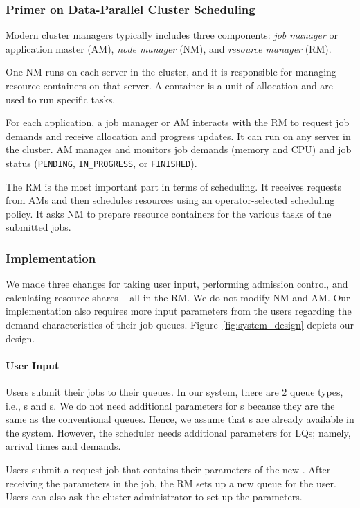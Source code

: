 \subsubsection*{Primer on Data-Parallel Cluster Scheduling}
Modern cluster managers typically includes three components: \emph{job manager} or application master (AM), \emph{node manager} (NM), and \emph{resource manager} (RM).

One NM runs on each server in the cluster, and it is responsible for managing resource containers on that server. 
A container is a unit of allocation and are used to run specific tasks. 

For each application, a job manager or AM interacts with the RM to request job demands and receive allocation and progress updates. 
It can run on any server in the cluster. 
AM manages and monitors job demands (memory and CPU) and job status (\texttt{PENDING}, \texttt{IN\_PROGRESS}, or \texttt{FINISHED}). 

The RM is the most important part in terms of scheduling. 
It receives requests from AMs and then schedules resources using an operator-selected scheduling policy. 
It asks NM to prepare resource containers for the various tasks of the submitted jobs.

\subsubsection*{\name Implementation}
We made three changes for taking user input, performing admission control, and calculating resource shares -- all in the RM.
We do not modify NM and AM.
Our implementation also requires more input parameters from the users regarding the demand characteristics of their job queues. 
Figure~\ref{fig:system_design} depicts our design.

\paragraph{User Input} Users submit their jobs to their queues. 
In our system, there are 2 queue types, i.e., {\burstq}s and {\batchq}s. 
We do not need additional parameters for {\batchq}s because they are the same as the conventional queues. 
Hence, we assume that {\batchq}s are already available in the system. 
However, the \name scheduler needs additional parameters for LQs; namely, arrival times and demands.

Users submit a request job that contains their parameters of the new \burstq. 
After receiving the parameters in the job, the RM sets up a new \burstq queue for the user.
Users can also ask the cluster administrator to set up the parameters. 

